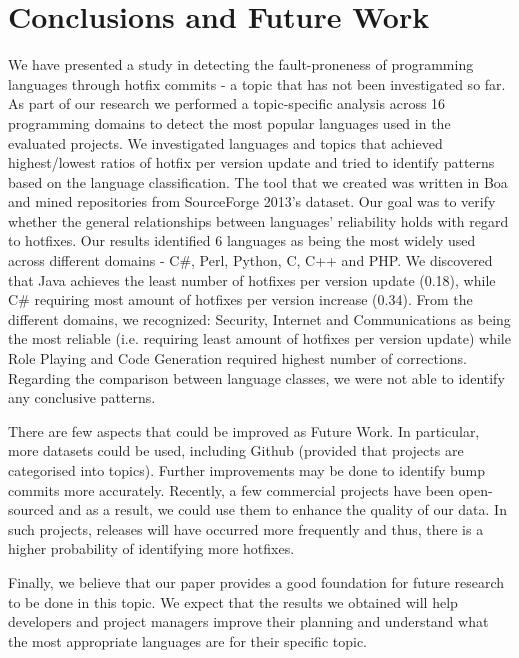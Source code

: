 \section{Conclusions and Future Work}
We have presented a study in detecting the fault-proneness of programming languages through hotfix commits - a topic that has not been investigated so far. As part of our research we performed a topic-specific analysis across 16 programming domains to detect the most popular languages used in the evaluated  projects. We investigated languages and topics that achieved highest/lowest ratios of hotfix per version update and tried to identify patterns based on the language classification. The tool that we created was written in Boa and mined repositories from SourceForge 2013's dataset. Our goal was to verify whether the general relationships between languages' reliability holds with regard to hotfixes.  
Our results identified 6 languages as being the most widely used across different domains - C\#, Perl, Python, C, C++ and PHP. We discovered that Java achieves the least number of hotfixes per version update (0.18), while C\# requiring most amount of hotfixes per version increase (0.34). From the different domains, we recognized: Security, Internet and Communications as being the most reliable (i.e. requiring least amount of hotfixes per version update) while Role Playing and Code Generation required highest number of corrections. Regarding the comparison between language classes, we were not able to identify any conclusive patterns.\par
There are few aspects that could be improved as Future Work. In particular, more datasets could be used, including Github (provided that projects are categorised into topics). Further improvements may be done to identify bump commits more accurately. Recently, a few commercial projects have been open-sourced and as a result, we could use them to enhance the quality of our data. In such projects, releases will have occurred more frequently and thus, there is a higher probability of identifying more hotfixes.\par
Finally, we believe that our paper provides a good foundation for future research to be done in this topic. We expect that the results we obtained will help developers and project managers improve their planning and understand what the most appropriate languages are for their specific topic.



 

